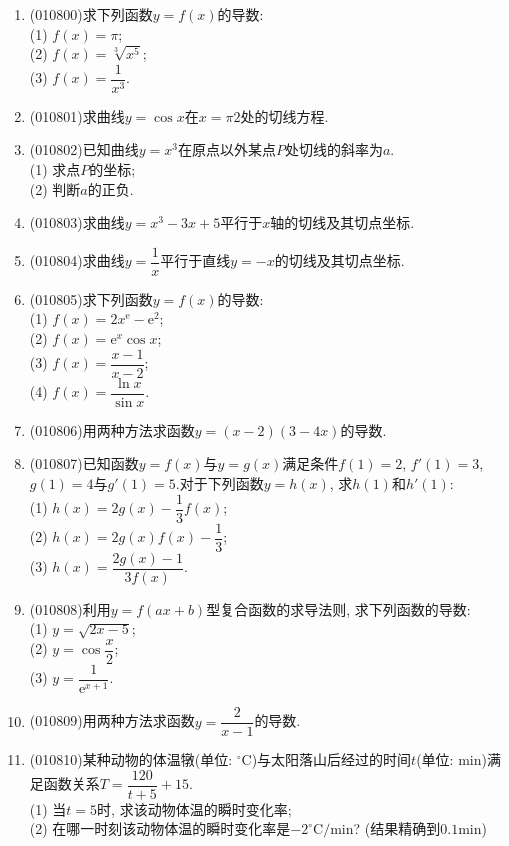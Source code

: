\documentclass[10pt,a4paper]{article}
\begin{document}
\begin{enumerate}[1.]
\begin{center}
\end{center}
\item {\tiny (010800)}求下列函数$y=f(x)$的导数:\\
(1) $f(x)=\pi$;\\
(2) $f(x)=\sqrt[3]{x^5}$;\\
(3) $f(x)=\dfrac1{x^3}$.
\item {\tiny (010801)}求曲线$y=\cos x$在$x=\pi 2$处的切线方程.
\item {\tiny (010802)}已知曲线$y=x^3$在原点以外某点$P$处切线的斜率为$a$.\\
(1) 求点$P$的坐标;\\
(2) 判断$a$的正负.
\item {\tiny (010803)}求曲线$y=x^3-3x+5$平行于$x$轴的切线及其切点坐标.
\item {\tiny (010804)}求曲线$y=\dfrac 1x$平行于直线$y=-x$的切线及其切点坐标.
\item {\tiny (010805)}求下列函数$y=f(x)$的导数:\\
(1) $f(x)=2x^{\mathrm{e}}-\mathrm{e}^2$;\\
(2) $f(x)=\mathrm{e}^x\cos x$;\\
(3) $f(x)=\dfrac{x-1}{x-2}$;\\
(4) $f(x)=\dfrac{\ln x}{\sin x}$.
\item {\tiny (010806)}用两种方法求函数$y=(x-2)(3-4x)$的导数.
\item {\tiny (010807)}已知函数$y=f(x)$与$y=g(x)$满足条件$f(1)=2$, $f'(1)=3$, $g(1)=4$与$g'(1)=5$.对于下列函数$y=h(x)$, 求$h(1)$和$h'(1)$:\\
(1) $h(x)=2g(x)-\dfrac 13f(x)$;\\
(2) $h(x)=2g(x)f(x)-\dfrac 13$;\\
(3) $h(x)=\dfrac{2g(x)-1}{3f(x)}$.
\item {\tiny (010808)}利用$y=f(ax+b)$型复合函数的求导法则, 求下列函数的导数:\\
(1) $y= \sqrt{2x-5}$;\\
(2) $y=\cos \dfrac x2$;\\
(3) $y= \dfrac 1{\mathrm{e}^{x+1}}$.
\item {\tiny (010809)}用两种方法求函数$y= \dfrac 2{x-1}$的导数.
\item {\tiny (010810)}某种动物的体温犜(单位: $^\circ\text{C}$)与太阳落山后经过的时间$t$(单位: $\text{min}$)满足函数关系$T=\dfrac{120}{t+5}+15$.\\
(1) 当$t=5$时, 求该动物体温的瞬时变化率;\\
(2) 在哪一时刻该动物体温的瞬时变化率是$-2^\circ\text{C}/\text{min}$? (结果精确到$0.1\text{min}$)

\end{enumerate}
\end{document}
